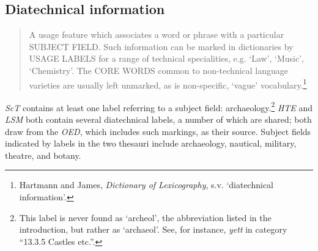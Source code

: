 \subsection*{Diatechnical information}
\begin{quotation} \noindent
A usage feature which associates a word or phrase with a particular SUBJECT FIELD. Such information can be marked in dictionaries by USAGE LABELS for a range of technical specialities, e.g. `Law', `Music', `Chemistry'. The CORE WORDS common to non-technical language varieties are usually left unmarked, as is non-specific, `vague' vocabulary.\footnote{Hartmann and James, \textit{Dictionary of Lexicography}, s.v. `diatechnical information'.}
\end{quotation}
\textit{ScT} contains at least one label referring to a subject field: archaeology.\footnote{This label is never found as `archeol', the abbreviation listed in the introduction, but rather as `archaeol'. See, for instance, \textit{yett} in category ``13.3.5 Castles etc.''.} \textit{HTE} and \textit{LSM} both contain several diatechnical labels, a number of which are shared; both draw from the \textit{OED}, which includes such markings, as their source. Subject fields indicated by labels in the two thesauri include archaeology, nautical, military, theatre, and botany.

